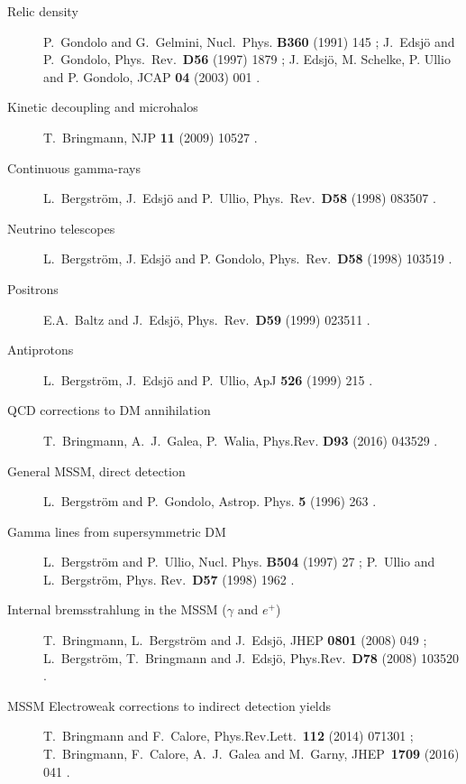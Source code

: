 \documentclass[a4paper,10pt,oneside]{book}
\begin{document}
  \begin{description}
    \item[Relic density] P.~Gondolo and G.~Gelmini, Nucl.\ Phys. 
         {\bfseries B360} (1991) 145 \cite{Gondolo:1990dk}; J.~Edsj{\"o} and P.~Gondolo, 
         Phys.\ Rev.\ {\bfseries D56} (1997) 1879 \cite{Edsjo:1997bg}; J. Edsj\"o, 
         M. Schelke, P. Ullio and P. Gondolo, JCAP {\bfseries 04} (2003) 001 \cite{Edsjo:2003us}.
    \item[Kinetic decoupling and microhalos]
      T.~Bringmann, NJP {\bfseries 11} (2009) 10527 \cite{Bringmann:2009vf}.
    \item[Continuous gamma-rays]
      L.~Bergstr{\"o}m, J.~Edsj{\"o} and P.~Ullio, Phys.\ Rev.\ {\bfseries D58} (1998) 083507 \cite{Bergstrom:1998zs}.
    \item[Neutrino telescopes]
       L.~Bergstr{\"o}m, J. Edsj{\"o} and P. Gondolo, Phys.\ Rev.\
      {\bfseries D58} (1998) 103519 \cite{Bergstrom:1998xh}.
    \item[Positrons]
      E.A.~Baltz and J.~Edsj{\"o}, Phys.\ Rev.\ {\bfseries D59} (1999) 023511 \cite{Baltz:1998xv}.
    \item[Antiprotons]
      L.~Bergstr{\"o}m, J.~Edsj{\"o} and P.~Ullio, ApJ {\bfseries 526} (1999) 215 \cite{Bergstrom:1999jc}.
    \item[QCD corrections to DM annihilation]
      T.~Bringmann, A.~J.~Galea, P.~Walia,  Phys.Rev. {\bfseries D93} (2016) 043529 \cite{Bringmann:2015cpa}.
    \item[General MSSM, direct detection] L.~Bergstr{\"o}m and
      P.~Gondolo, Astrop. Phys. {\bfseries 5} (1996) 263 \cite{Bergstrom:1995cz}.
    \item[Gamma lines from supersymmetric DM]
      L.~Bergstr{\"o}m and P.~Ullio, Nucl. Phys. {\bfseries B504} (1997) 27 \cite{Bergstrom:1997fh};
    P.~Ullio and L.~Bergstr\"om, Phys. Rev.\ {\bfseries D57} (1998) 1962 \cite{Ullio:1997ke}.
    \item[Internal bremsstrahlung in the MSSM ($\gamma$ and $e^+$)]
      T.~Bringmann, L.~Bergstr{\"o}m and J.~Edsj{\"o}, JHEP {\bfseries 0801} (2008) 049 \cite{Bringmann:2007nk};
       L.~Bergstr{\"o}m, T.~Bringmann and J.~Edsj{\"o}, Phys.Rev.\ {\bfseries D78} (2008) 103520 \cite{Bergstrom:2008gr}.
    \item[MSSM Electroweak corrections to indirect detection yields]
       T.~Bringmann and F.~Calore,  Phys.Rev.Lett.\ {\bfseries 112} (2014) 071301 \cite{Bringmann:2013oja};
       T.~Bringmann, F.~Calore, A.~J.~Galea and M.~Garny, JHEP\ {\bfseries 1709} (2016) 041 \cite{Bringmann:2017sko}.
  \end{description}
\end{document}
